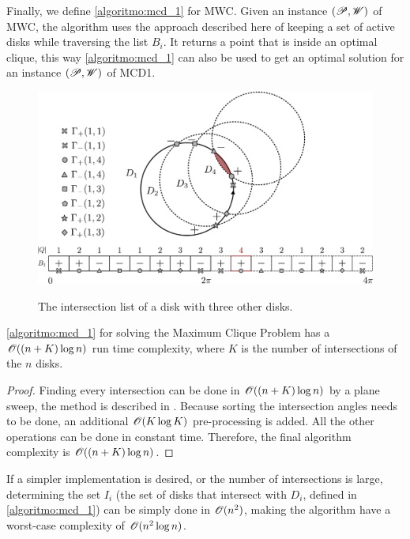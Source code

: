 Finally, we define \autoref{algoritmo:mcd_1} for MWC. Given an instance $(\mathscr{P}, \mathscr{W})$ of MWC, the algorithm uses the approach described here of keeping a set of active disks while traversing the list $B_i$. It returns a point that is inside an optimal clique, this way \autoref{algoritmo:mcd_1} can also be used to get an optimal solution for an instance $(\mathscr{P}, \mathscr{W})$ of MCD1.
 
\begin{figure}
    \centering
    
    \caption{The intersection list of a disk with three other disks.}
    \includegraphics[scale=.3]{tex/figures/3_disks_intersect2.pdf}
    \fautor
    \label{fig:array_disks}
\end{figure}

\begin{theorem}\label{lema:disk}
	\autoref{algoritmo:mcd_1} for solving the Maximum Clique Problem has a $\mathscr{O}((n+K)\log{n})$ run time complexity, where $K$ is the number of intersections of the $n$ disks.
\end{theorem}

\begin{proof}
	Finding every intersection can be done in $\mathscr{O}((n+K)\log{n})$  by a plane sweep, the method is described in . 
	Because sorting the intersection angles needs to be done, an additional $\mathscr{O}(K\log{K})$ pre-processing is added. All the other operations can be done in constant time. Therefore, the final algorithm complexity is $\mathscr{O}((n+K)\log{n})$.
\end{proof}

If a simpler implementation is desired, or the number of intersections is large, determining the set $I_i$ (the set of disks that intersect with $D_i$, defined in \autoref{algoritmo:mcd_1}) can be simply done in $\mathscr{O}(n^2)$, making the algorithm have a worst-case complexity of $\mathscr{O}(n^2\log{n})$.

